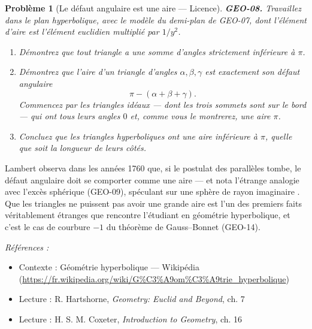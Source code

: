 \documentclass[11pt]{article}
\newtheorem{problem}{Problème}
\newenvironment{refs}{\par\small\noindent\emph{Références :}\begin{itemize}\setlength\itemsep{0pt}}{\end{itemize}\normalsize}
\begin{document}
\begin{problem}[{Le défaut angulaire est une aire --- Licence}]
\textbf{GEO-08.} Travaillez dans le plan hyperbolique, avec le modèle du demi-plan de GEO-07,
dont l'élément d'aire est l'élément euclidien multiplié par $ 1/y^2 $.
\begin{enumerate}
\item[(a)] Démontrez que tout triangle a une somme d'angles strictement inférieure à $ \pi $.
\item[(b)] Démontrez que l'aire d'un triangle d'angles $ \alpha, \beta, \gamma $ est exactement son
défaut angulaire
\[ \pi - (\alpha + \beta + \gamma). \]
Commencez par les triangles idéaux --- dont les trois sommets sont sur le bord --- qui ont tous
leurs angles $ 0 $ et, comme vous le montrerez, une aire $ \pi $.
\item[(c)] Concluez que les triangles hyperboliques ont une aire inférieure à $ \pi $, quelle que soit
la longueur de leurs côtés.
\end{enumerate}

\end{problem}

\noindent Lambert observa dans les années 1760 que, si le postulat des parallèles tombe,
le défaut angulaire doit se comporter comme une aire --- et nota l'étrange analogie avec l'excès
sphérique (GEO-09), spéculant sur une \og{} sphère de rayon imaginaire \fg{}. Que les triangles ne
puissent pas avoir une grande aire est l'un des premiers faits véritablement étranges que
rencontre l'étudiant en géométrie hyperbolique, et c'est le cas de courbure $ -1 $ du théorème
de Gauss--Bonnet (GEO-14).

\begin{refs}
\item Contexte : Géométrie hyperbolique --- Wikipédia (\url{https://fr.wikipedia.org/wiki/G%C3%A9om%C3%A9trie_hyperbolique})
\item Lecture : R. Hartshorne, \textit{Geometry: Euclid and Beyond}, ch. 7
\item Lecture : H. S. M. Coxeter, \textit{Introduction to Geometry}, ch. 16
\end{refs}

\bigskip
\end{document}
